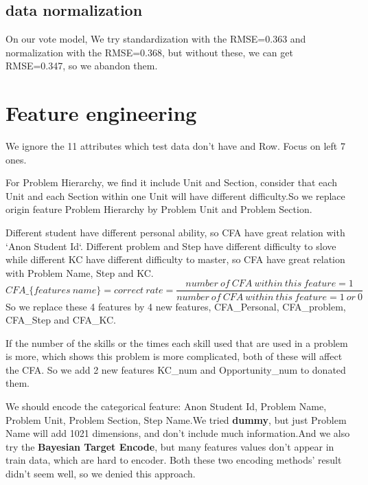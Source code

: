 \documentclass{article}
\begin{document}
    \subsection{data normalization}
    On our vote model, We try standardization with the RMSE=0.363 and normalization with the RMSE=0.368, but without these, we can get RMSE=0.347, so we abandon them.


    \section{Feature engineering}\label{sec:feature-engineering}

    We ignore the 11 attributes which test data don't have and Row.
	Focus on left 7 ones.

    For Problem Hierarchy, we find it include Unit and Section, consider that each Unit and each Section within one Unit will have different difficulty.So we replace origin feature Problem Hierarchy by Problem Unit and Problem Section.

    Different student have different personal ability, so CFA have great relation with `Anon Student Id`.
	Different problem and Step have different difficulty to slove while different KC have different difficulty to master, so CFA have great relation with Problem Name, Step and KC.
    \[CFA\_\{features\ name\}=correct\ rate=\frac{number\  of\  CFA \ within\ this\ feature=1}{number\ of\ CFA\ within \ this\ feature= 1\ or\ 0}\]
    So we replace these 4 features by 4 new features, CFA\_Personal, CFA\_problem, CFA\_Step and CFA\_KC\@.

    If the number of the skills or the times each skill used that are used in a problem is more, which shows this problem is more complicated, both of these will affect the CFA\@.
    So we add 2 new features KC\_num and Opportunity\_num to donated them.

    We should encode the categorical feature: Anon Student Id, Problem Name, Problem Unit, Problem Section, Step Name.We tried \textbf{dummy}, but just Problem Name will add 1021 dimensions, and don't include much information.And we also try the \textbf{Bayesian Target Encode}, but many features values don't appear in train data, which are hard to encoder.
	Both these two encoding methods' result didn't seem well, so we denied this approach.
\end{document}

